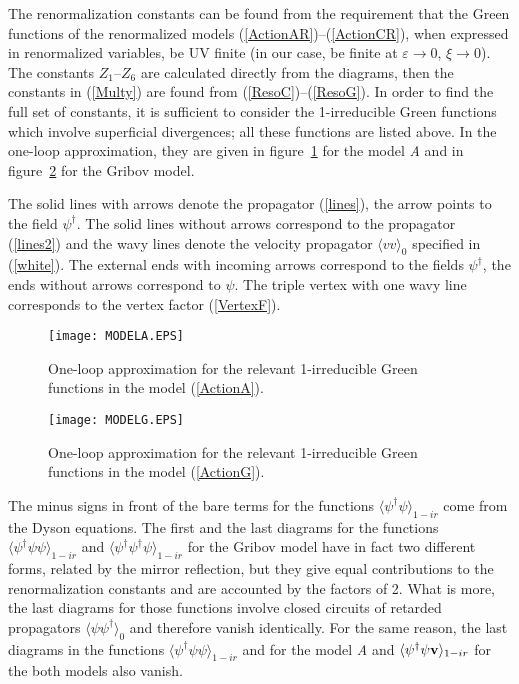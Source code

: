 \documentclass[12pt]{iopart}
\begin{document}
The renormalization constants can be found from the requirement that the
Green functions of the renormalized models
(\ref{ActionAR})--(\ref{ActionCR}), when expressed in renormalized
variables, be UV finite (in our case, be finite at $\varepsilon\to0$,
$\xi\to0$). The constants $Z_{1}$--$Z_{6}$ are calculated directly from
the diagrams, then the constants in (\ref{Multy}) are found from
(\ref{ResoC})--(\ref{ResoG}). In order to find the full set of constants,
it is sufficient to consider the 1-irreducible Green functions which involve
superficial divergences; all these functions are listed above.
In the one-loop approximation, they are given in figure~\ref{fig:DA} for the
model {\it A} and in figure~\ref{fig:DG} for the Gribov model.

The solid lines with arrows denote the propagator (\ref{lines}),
the arrow points to the field $\psi^{\dag}$. The solid lines without arrows
correspond to the propagator (\ref{lines2}) and the wavy lines denote the
velocity propagator $\langle vv \rangle_{0}$ specified in (\ref{white}).
The external ends with incoming arrows correspond to the fields
$\psi^{\dag}$, the ends without arrows correspond to $\psi$. The triple
vertex with one wavy line corresponds to the vertex factor (\ref{VertexF}).

\begin{figure}
\begin{center}
\texttt{[image: MODELA.EPS]}
\caption{\label{fig:DA}
One-loop approximation for the relevant 1-irreducible Green functions
in the model (\protect\ref{ActionA}).}
\end{center}
\end{figure}


\begin{figure}
\begin{center}
\texttt{[image: MODELG.EPS]}
\caption{\label{fig:DG}
One-loop approximation for the relevant 1-irreducible Green functions
in the model (\protect\ref{ActionG}).}
\end{center}
\end{figure}



The minus signs in front of the bare terms for the functions
$\langle \psi^{\dag} \psi \rangle_{1-ir}$ come from the Dyson equations.
The first and the last diagrams for the functions
$\langle \psi^{\dag} \psi \psi  \rangle_{1-ir}$ and
$\langle \psi^{\dag} \psi^{\dag} \psi \rangle_{1-ir}$ for the Gribov model
have in fact two different forms, related by the mirror reflection,
but they give equal contributions to the renormalization constants and
are accounted by the factors of 2.
What is more, the last diagrams for those functions involve closed circuits
of retarded propagators $\langle \psi \psi^{\dag} \rangle_{0}$ and therefore
vanish identically. For the same reason, the last diagrams in the functions
$\langle \psi^{\dag} \psi \psi  \rangle_{1-ir}$ and for the model {\it A}
and $\langle \psi^{\dag}\psi {\bf v} \rangle_{1-ir}$ for the both models
also vanish.
\end{document}
